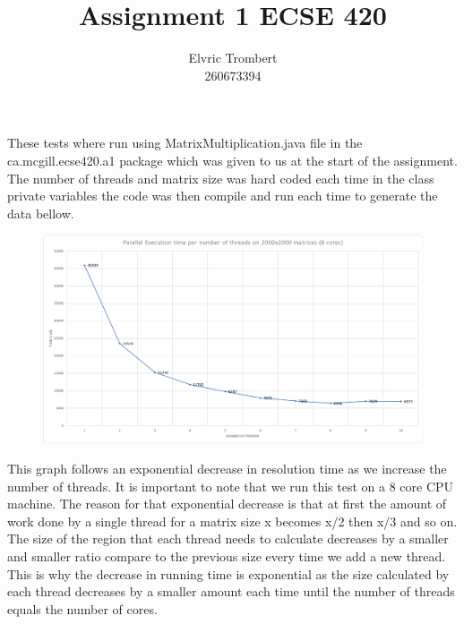 \documentclass[11pt,letterpaper]{exam}
\author{Elvric Trombert\\260673394}%
\title{Assignment 1 ECSE 420}
\begin{document}
	\maketitle
	\hrulefill
	\begin{questions}
		\question
			These tests where run using MatrixMultiplication.java file in the ca.mcgill.ecse420.a1 package which was given to us at the start of the assignment. The number of threads and matrix size was hard coded each time in the class private variables the code was then compile and run each time to generate the data bellow.
			\begin{figure}[h!]
				\centering
				\includegraphics[scale=0.5]{ExecutionTimeThread}
			\end{figure}
			This graph follows an exponential decrease in resolution time as we increase the number of threads. It is important to note that we run this test on a 8 core CPU machine. The reason for that exponential decrease is that at first the amount of work done by a single thread for a matrix size x becomes x/2 then x/3 and so on. The size of the region that each thread needs to calculate decreases by a smaller and smaller ratio compare to the previous size every time we add a new thread. This is why the decrease in running time is exponential as the size calculated by each thread decreases by a smaller amount each time until the number of threads equals the number of cores.
			

\end{questions}
\end{document}
